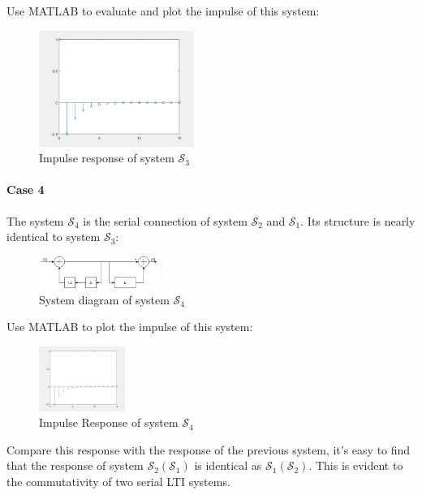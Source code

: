 \documentclass[conference]{IEEEtran}
\begin{document}
Use MATLAB to evaluate and plot the impulse of this system:
\begin{figure}[htpb]
	\begin{small}
		\begin{center}
			\includegraphics[width=0.45\textwidth]{../matlab/q24_3.png}
		\end{center}
		\caption{Impulse response of system \(\mathcal{S}_{3}\)}
		\label{fig:18}
	\end{small}
\end{figure}

\paragraph{Case 4}
The system \(\mathcal{S}_{4}\) is the serial connection of system \(\mathcal{S}_{2}\) and \(\mathcal{S}_{1}\). Its structure is nearly identical to system \(\mathcal{S}_{3}\):
\begin{figure}[htpb]
	\begin{small}
		\begin{center}
			\includegraphics[width=0.35\textwidth]{24-4.png}
		\end{center}
		\caption{System diagram of system \(\mathcal{S}_{4}\)}
		\label{fig:19}
	\end{small}
\end{figure}

Use MATLAB to plot the impulse of this system:

\begin{figure}[htb]
	\begin{small}
		\begin{center}
			\includegraphics[width=0.25\textwidth]{../matlab/q24_4.png}
		\end{center}
		\caption{Impulse Response of system \(\mathcal{S}_{4}\)}
		\label{fig:20}
	\end{small}
\end{figure}
Compare this response with the response of the previous system, it's easy to find that the response of system \(\mathcal{S}_{2}(\mathcal{S}_{1})\) is identical as \(\mathcal{S}_{1}(\mathcal{S}_{2})\).
This is evident to the commutativity of two serial LTI systems.
\end{document}
